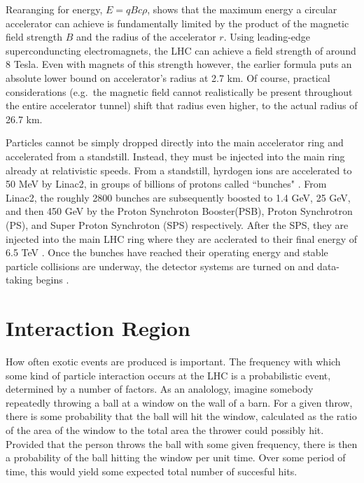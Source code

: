     Rearanging for energy, $E = q B c \rho$, shows that the maximum energy a circular accelerator can achieve is fundamentally limited by the product of the magnetic field strength $B$ and the radius of the accelerator $r$.
    Using leading-edge superconduncting electromagnets, the LHC can achieve a field strength of around 8 Tesla.
    Even with magnets of this strength however, the earlier formula puts an absolute lower bound on accelerator's radius at 2.7 km.
    Of course, practical considerations (e.g.\ the magnetic field cannot realistically be present throughout the entire accelerator tunnel) shift that radius even higher, to the actual radius of 26.7 km.

    Particles cannot be simply dropped directly into the main accelerator ring and accelerated from a standstill.
    Instead, they must be injected into the main ring already at relativistic speeds.
    From a standstill, hyrdogen ions are accelerated to 50 MeV by Linac2, in groups of billions of protons called ``bunches" \cite{lhc_run2}.
    From Linac2, the roughly 2800 bunches are subsequently boosted to 1.4 GeV, 25 GeV, and then 450 GeV by the Proton Synchroton Booster(PSB), Proton Synchrotron (PS), and Super Proton Synchroton (SPS) respectively.
    After the SPS, they are injected into the main LHC ring where they are acclerated to their final energy of 6.5 TeV \cite{lhc_machine}.
    Once the bunches have reached their operating energy and stable particle collisions are underway, the detector systems are turned on and data-taking begins \cite{data_quality}.
    


\section{Interaction Region}
    How often exotic events are produced is important.
    The frequency with which some kind of particle interaction occurs at the LHC is a probabilistic event, determined by a number of factors.
    As an analology, imagine somebody repeatedly throwing a ball at a window on the wall of a barn.
    For a given throw, there is some probability that the ball will hit the window, calculated as the ratio of the area of the window to the total area the thrower could possibly hit.
    Provided that the person throws the ball with some given frequency, there is then a probability of the ball hitting the window per unit time.
    Over some period of time, this would yield some expected total number of succesful hits.

